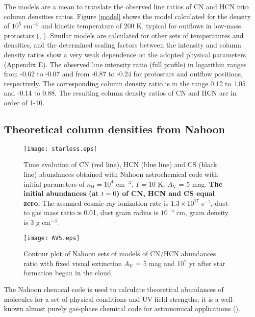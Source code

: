 \documentclass{aa}
\begin{document}
The models are a mean to translate the observed line ratios of CN and HCN into column densities ratios. 
Figure \ref{model} shows the model calculated for the density of $10^{5}$ cm$^{-3}$ and kinetic temperature 
of 200 K, typical for outflows in low-mass protostars (\citealt{vKe09b}, \citealt{Yil15}). Similar models are calculated for other sets of 
temperatures and densities, and the determined scaling factors between the intensity and column
density ratios show a very weak dependence on the adopted physical parameters (Appendix E). The observed line intensity ratio (full profile) 
in logarithm ranges from -0.62 to -0.07 and from -0.87 to -0.24 for protostars and outflow positions, respectively.
The corresponding column density ratio is
in the range 0.12 to 1.05 and -0.14 to 0.88. The resulting 
column density ratios of CN and HCN are in order of 1-10.


\subsection{Theoretical column densities from Nahoon}
\label{subsection:nahoon}

\begin{figure} 
\centering 
\texttt{[image: starless.eps]} 
\caption{Time evolution of CN
(red line), HCN (blue line) and CS (black line) abundances obtained with Nahoon astrochemical code
with initial parameters of $n_\mathrm{H} = 10^4$ cm$^{-3}$, $T = 10$ K, $A_\mathrm{V}$ =
5 mag. \textbf{The initial abundances (at $t = 0$) of CN, HCN and CS equal zero.} The assumed cosmic-ray ionization rate is $1.3\times10^{17}$ s$^{-1}$, dust to gas mass ratio
is 0.01, dust grain radius is $10^{-5}$ cm, grain density is 3 g cm$^{-3}$.} 
\label{starless}
\end{figure}
\begin{figure} 
\centering 
\texttt{[image: AV5.eps]} 
\caption{Contour plot of Nahoon sets
of models of CN/HCN abundances ratio with fixed visual extinction $A_\mathrm{V}$ = 5 mag and 10$^{7}$ yr after star formation began in the cloud.} 
\label{AV5} 
\end{figure}
The Nahoon chemical code is used to calculate theoretical abundances of 
molecules for a set of physical conditions and UV field strengths; it is a well-known
almost purely gas-phase chemical code for astronomical applications (\citealt{Wak15}). 
\end{document}
